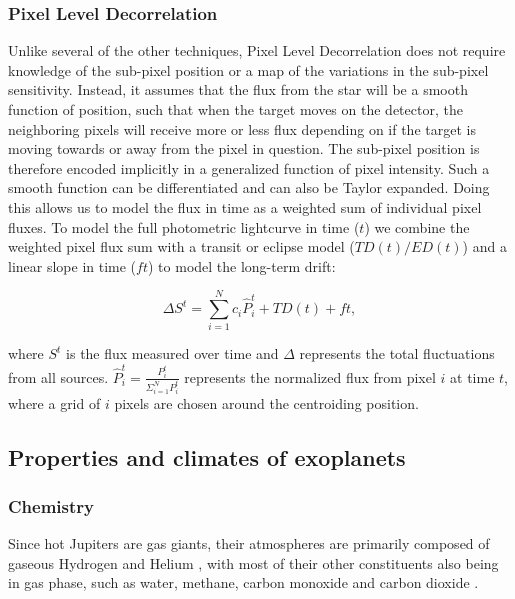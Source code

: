 \subsubsection{Pixel Level Decorrelation}

Unlike several of the other techniques, Pixel Level Decorrelation \citep{Deming2015} does not require knowledge of the sub-pixel position or a map of the variations in the sub-pixel sensitivity. Instead, it assumes that the flux from the star will be a smooth function of position, such that when the target moves on the detector, the neighboring pixels will receive more or less flux depending on if the target is moving towards or away from the pixel in question. The sub-pixel position is therefore encoded implicitly in a generalized function of pixel intensity. Such a smooth function can be differentiated and can also be Taylor expanded. Doing this allows us to model the flux in time as a weighted sum of individual pixel fluxes. To model the full photometric lightcurve in time ($t$) we combine the weighted pixel flux sum with a transit or eclipse model ($TD(t)/ED(t)$) and a linear slope in time ($ft$) to model the long-term drift:

\begin{equation}
    \Delta S^t = \sum_{i=1}^{N}c_i \hat{P}_i^t + TD(t) + ft,
\end{equation}

where $S^t$ is the flux measured over time and $\Delta$ represents the total fluctuations from all sources. $\hat{P}_i^t = \frac{P_i^t}{\Sigma_{i=1}^{N}P_i^t}$ represents the normalized flux from pixel $i$ at time $t$, where a grid of $i$ pixels are chosen around the centroiding position.

\subsection{Properties and climates of exoplanets}%

\subsubsection{Chemistry}

Since hot Jupiters are gas giants, their atmospheres are primarily composed of gaseous Hydrogen and Helium \citep{Seager1999}, with most of their other constituents also being in gas phase, such as water, methane, carbon monoxide and carbon dioxide \citep{Brown2001}.

